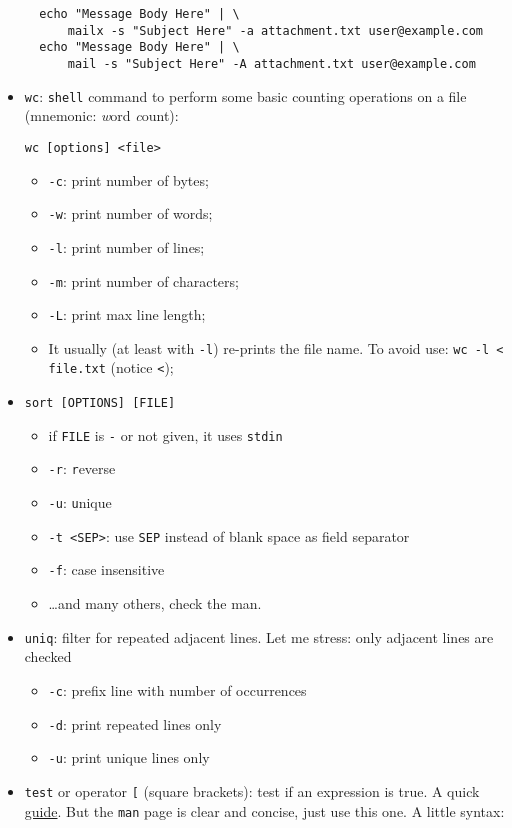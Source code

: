 \documentclass[a4paper,12pt,%
              final%
              ]{article}
\begin{document}
\begin{itemize}
\begin{verbatim}
  echo "Message Body Here" | \
      mailx -s "Subject Here" -a attachment.txt user@example.com
  echo "Message Body Here" | \
      mail -s "Subject Here" -A attachment.txt user@example.com
\end{verbatim}
  \item \texttt{wc}: \texttt{shell} command to perform some basic counting operations on a file (mnemonic: \emph{w}ord \emph{c}ount):
\begin{verbatim}
wc [options] <file>
\end{verbatim}
    \begin{itemize}
      \item \verb|-c|: print number of bytes;
      \item \verb|-w|: print number of words;
      \item \verb|-l|: print number of lines;
      \item \verb|-m|: print number of characters;
      \item \verb|-L|: print max line length;
      \item It usually (at least with \verb|-l|) re-prints the file name. To avoid use: \verb|wc -l < file.txt| (notice \verb|<|);
    \end{itemize}
  \item \texttt{sort [OPTIONS] [FILE]}
    \begin{itemize}
      \item if \texttt{FILE} is \texttt{-} or not given, it uses \texttt{stdin}
      \item \verb|-r|: \texttt{r}everse
      \item \verb|-u|: \texttt{u}nique
      \item \verb|-t <SEP>|: use \texttt{SEP} instead of blank space as field separator
      \item \verb|-f|: case insensitive
      \item \ldots and many others, check the man.
    \end{itemize}
  \item \texttt{uniq}: filter for repeated adjacent lines. Let me stress: only adjacent lines are checked
    \begin{itemize}
      \item \verb|-c|: prefix line with number of occurrences
      \item \verb|-d|: print repeated lines only
      \item \verb|-u|: print unique lines only
    \end{itemize}
  \item \texttt{test} or operator \verb|[| (square brackets): test if an expression is true. A quick \href{https://www.computerhope.com/unix/test.htm}{guide}. But the \texttt{man} page is clear and concise, just use this one. A little syntax:

\end{itemize}
\end{document}
